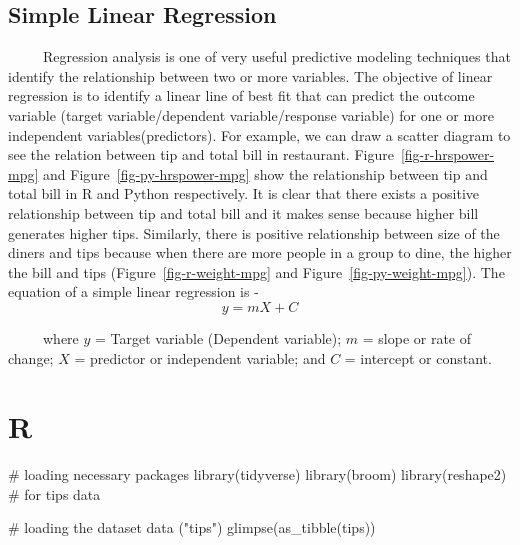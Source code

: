 \documentclass[
  letterpaper,
  DIV=11,
  numbers=noendperiod]{scrreprt}
\newenvironment{Shaded}{\begin{snugshade}}{\end{snugshade}}
\newcommand{\CommentTok}[1]{\textcolor[rgb]{0.37,0.37,0.37}{#1}}
\newcommand{\FunctionTok}[1]{\textcolor[rgb]{0.28,0.35,0.67}{#1}}
\newcommand{\NormalTok}[1]{\textcolor[rgb]{0.00,0.23,0.31}{#1}}
\newcommand{\StringTok}[1]{\textcolor[rgb]{0.13,0.47,0.30}{#1}}
\begin{document}
\subsection{Simple Linear Regression}\label{simple-linear-regression}

~~~~~Regression analysis is one of very useful predictive modeling
techniques that identify the relationship between two or more variables.
The objective of linear regression is to identify a linear line of best
fit that can predict the outcome variable (target variable/dependent
variable/response variable) for one or more independent
variables(predictors). For example, we can draw a scatter diagram to see
the relation between tip and total bill in restaurant.
Figure~\ref{fig-r-hrspower-mpg} and Figure~\ref{fig-py-hrspower-mpg}
show the relationship between tip and total bill in R and Python
respectively. It is clear that there exists a positive relationship
between tip and total bill and it makes sense because higher bill
generates higher tips. Similarly, there is positive relationship between
size of the diners and tips because when there are more people in a
group to dine, the higher the bill and tips
(Figure~\ref{fig-r-weight-mpg} and Figure~\ref{fig-py-weight-mpg}). The
equation of a simple linear regression is - \[y= mX + C\]

~~~~~where \(y\) = Target variable (Dependent variable); \(m\) = slope
or rate of change; \(X\) = predictor or independent variable; and \(C\)
= intercept or constant.

\section{R}

\begin{Shaded}
\begin{Highlighting}[]
\CommentTok{\# loading necessary packages }
\FunctionTok{library}\NormalTok{(tidyverse)}
\FunctionTok{library}\NormalTok{(broom)}
\FunctionTok{library}\NormalTok{(reshape2) }\CommentTok{\# for tips data }
\end{Highlighting}
\end{Shaded}

\begin{Shaded}
\begin{Highlighting}[]
\CommentTok{\# loading the dataset }
\FunctionTok{data}\NormalTok{ (}\StringTok{"tips"}\NormalTok{)}
\FunctionTok{glimpse}\NormalTok{(}\FunctionTok{as\_tibble}\NormalTok{(tips))}
\end{Highlighting}
\end{Shaded}
\end{document}
